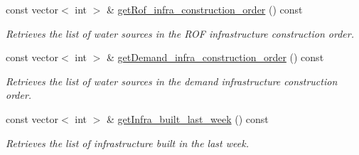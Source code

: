 \begin{DoxyCompactItemize}
const vector$<$ int $>$ \& \mbox{\hyperlink{classInfrastructureManager_a0f944c7704cc5418ba58b71c7a1e15a7}{get\+Rof\+\_\+infra\+\_\+construction\+\_\+order}} () const
\begin{DoxyCompactList}\small\item\em Retrieves the list of water sources in the R\+OF infrastructure construction order. \end{DoxyCompactList}\item 
const vector$<$ int $>$ \& \mbox{\hyperlink{classInfrastructureManager_aac2a99dbffe7f784f09de907ad384d8b}{get\+Demand\+\_\+infra\+\_\+construction\+\_\+order}} () const
\begin{DoxyCompactList}\small\item\em Retrieves the list of water sources in the demand infrastructure construction order. \end{DoxyCompactList}\item 
const vector$<$ int $>$ \& \mbox{\hyperlink{classInfrastructureManager_a540f233692981645d52af7f1de087dbf}{get\+Infra\+\_\+built\+\_\+last\+\_\+week}} () const
\begin{DoxyCompactList}\small\item\em Retrieves the list of infrastructure built in the last week. \end{DoxyCompactList}\end{DoxyCompactItemize}
